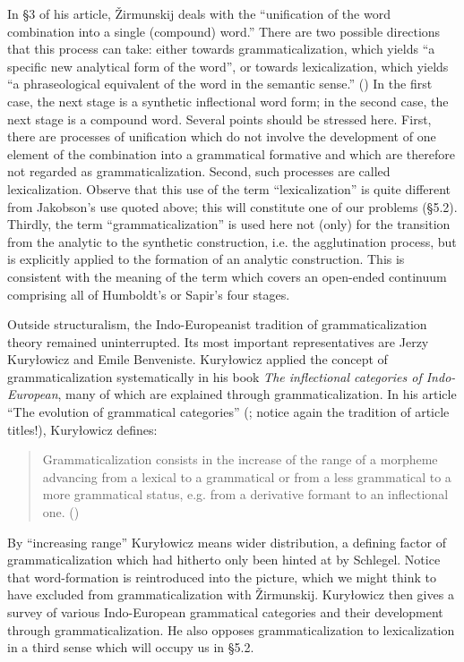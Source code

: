 In §3 of his article, Žirmunskij deals with the “unification of the word combination into a single (compound) word.” There are two possible directions that this process can take: either towards grammaticalization, which yields “a specific new analytical form of the word”, or towards lexicalization, which yields “a phraseological equivalent of the word in the semantic sense.” (\citeyear[83]{Žirmunskij1966}) In the first case, the next stage is a synthetic inflectional word form; in the second case, the next stage is a compound word. Several points should be stressed here. First, there are processes of unification which do not involve the development of one element of the combination into a grammatical formative and which are therefore not regarded as grammaticalization. Second, such processes are called lexicalization. Observe that this use of the term “lexicalization” is quite different from Jakobson's use quoted above; this will constitute one of our problems (§5.2). Thirdly, the term ``grammaticalization'' is used here not (only) for the transition from the analytic to the synthetic construction, i.e. the agglutination process, but is explicitly applied to the formation of an analytic construction. This is consistent with the meaning of the term which covers an open-ended continuum comprising all of Humboldt's or Sapir's four stages.

Outside structuralism, the Indo-Europeanist tradition of grammaticalization theory remained uninterrupted. Its most important representatives are Jerzy Kuryłowicz and Emile Benveniste. Kuryłowicz applied the concept of grammaticalization systematically in his book \textit{The inflectional categories of Indo-European}, many of which are explained through grammaticalization. In his article “The evolution of grammatical categories” (\citeyear{Kuryłowicz1965}; notice again the tradition of article titles!), Kuryłowicz defines:

\begin{quote} \label{quote:kurylowciz}
Grammaticalization consists in the increase of the range of a morpheme advancing from a lexical to a grammatical or from a less grammatical to a more grammatical status, e.g. from a derivative formant to an inflectional one. (\citeyear[52]{Kuryłowicz1965})
\end{quote}

\noindent By ``increasing range'' Kuryłowicz means wider distribution, a defining factor of grammaticalization which had hitherto only been hinted at by Schlegel. Notice that word-formation is reintroduced into the picture, which we might think to have excluded from grammaticalization with Žirmunskij. Kuryłowicz then gives a survey of various Indo-European grammatical categories and their development through grammaticalization. He also opposes grammaticalization to lexicalization in a third sense which will occupy us in §5.2.

